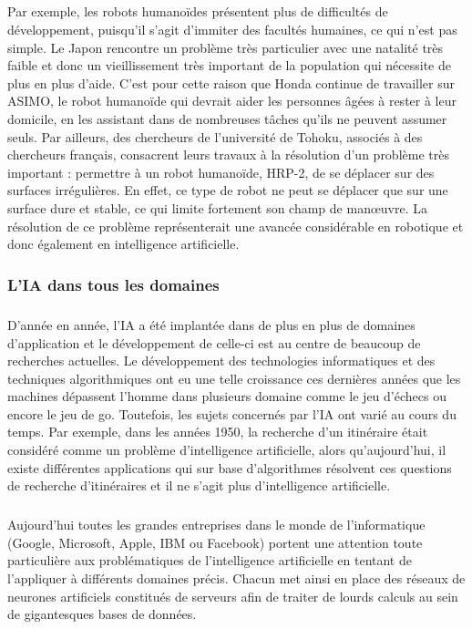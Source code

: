 \subparagraph{}
Par exemple, les robots humanoïdes présentent plus de difficultés de développement, puisqu’il s’agit d’immiter des facultés humaines, ce qui n’est pas simple. Le Japon rencontre un problème très particulier avec une natalité très faible et donc un vieillissement très important de la population qui nécessite de plus en plus d’aide. C’est pour cette raison que Honda continue de travailler sur ASIMO, le robot humanoïde qui devrait aider les personnes âgées à rester à leur domicile, en les assistant dans de nombreuses tâches qu’ils ne peuvent assumer seuls. Par ailleurs, des chercheurs de l’université de Tohoku, associés à des chercheurs français, consacrent leurs travaux à la résolution d’un problème très important : permettre à un robot humanoïde, HRP-2, de se déplacer sur des surfaces irrégulières. En effet, ce type de robot ne peut se déplacer que sur une surface dure et stable, ce qui limite fortement son champ de manœuvre. La résolution de ce problème représenterait une avancée considérable en robotique et donc également en intelligence artificielle.


\subsubsection{L'IA dans tous les domaines}
\subparagraph{}
D’année en année, l'IA a été implantée dans de plus en plus de domaines d'application et le développement de celle-ci est au centre de beaucoup de recherches actuelles. 
Le développement des technologies informatiques et des techniques algorithmiques ont eu une telle croissance ces dernières années que les machines dépassent l’homme dans plusieurs domaine comme le jeu d’échecs ou encore le jeu de go.
Toutefois, les sujets concernés par l’IA ont varié au cours du temps. Par exemple, dans les années 1950, la recherche d'un itinéraire était considéré comme un problème d'intelligence artificielle, alors qu’aujourd’hui, il existe différentes applications qui sur base d’algorithmes résolvent ces questions de recherche d'itinéraires et il ne s’agit plus d’intelligence artificielle.

\subparagraph{}
Aujourd’hui toutes les grandes entreprises dans le monde de l’informatique (Google, Microsoft, Apple, IBM ou Facebook) portent une attention toute particulière aux problématiques de l'intelligence artificielle en tentant de l'appliquer à différents domaines précis. 
Chacun met ainsi en place des réseaux de neurones artificiels constitués de serveurs afin de traiter de lourds calculs au sein de gigantesques bases de données.

